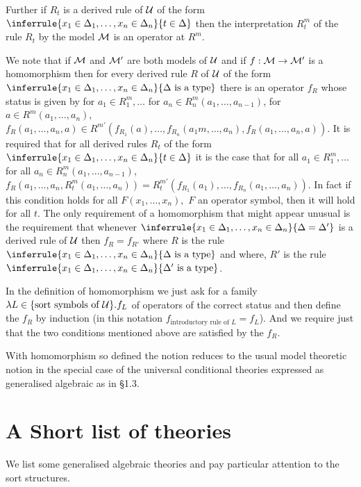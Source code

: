 Further if $R_t$ is a derived rule of $\mathcal{U}$ of the form $\inferrule{x_1\in\Delta_1,\ldots,x_n\in\Delta_n}{t\in\Delta}$ then the interpretation $R_t^m$ of the rule $R_t$ by the model $\mathcal{M}$ is an operator at $R^m$.

We note that if $\mathcal{M}$ and $\mathcal{M}'$ are both models of $\mathcal{U}$ and if $f:\mathcal{M}\to\mathcal{M}'$ is a homomorphism then for every derived rule $R$ of $\mathcal{U}$ of the form $\inferrule{x_1\in\Delta_1,\ldots,x_n\in\Delta_n}{\Delta\isatype}$ there is an operator $f_R$ whose status is given by for $a_1\in R_1^m,\ldots$ for $a_n\in R_n^m(a_1,\ldots,a_{n-1})$, for $a\in R^m(a_1,\ldots,a_n)$, $f_R(a_1,\ldots,a_n,a)\in R^{m'}(f_{R_1}(a),\ldots,f_{R_n}(a_1m,\ldots,a_n),f_R(a_1,\ldots,a_n,a))$.
%
It is required that for all derived rules $R_t$ of the form $\inferrule{x_1\in\Delta_1,\ldots,x_n\in\Delta_n}{t\in\Delta}$ it is the case that for all $a_1\in R_1^m,\ldots$ for all $a_n\in R_n^m(a_1,\ldots,a_{n-1})$, $f_R(a_1,\ldots,a_n,R_t^m(a_1,\ldots,a_n)) = R_t^{m'}(f_{R_1}(a_1),\ldots,f_{R_n}(a_1,\ldots,a_n)).$
%
In fact if this condition holds for all $F(x_1,\ldots,x_n),$ $F$ an operator symbol, then it will hold for all $t$.
%
The only requirement of a homomorphism that might appear unusual is the requirement that whenever $\inferrule{x_1\in\Delta_1,\ldots,x_n\in\Delta_n}{\Delta=\Delta'}$ is a derived rule of $\mathcal{U}$ then $f_R=f_{R'}$ where $R$ is the rule $\inferrule{x_1\in\Delta_1,\ldots,x_n\in\Delta_n}{\Delta\isatype}$ and where, $R'$ is the rule $\inferrule{x_1\in\Delta_1,\ldots,x_n\in\Delta_n}{\Delta'\isatype}$.

In the definition of homomorphism we just ask for a family $\lambda L\in\{\text{sort symbols of }\mathcal{U}\}.f_L$ of operators of the correct status and then define the $f_R$ by induction (in this notation $f_{\text{introductory rule of $L$}} = f_L$).
%
 And we require just that the two conditions mentioned above are satisfied by the $f_R$.

With homomorphism so defined the notion reduces to the usual model theoretic notion in the special case of the universal conditional theories expressed as generalised algebraic as in \S 1.3.

\section{A Short list of theories} \label{sec:source-1-10}

We list some generalised algebraic theories and pay particular attention to the sort structures.

